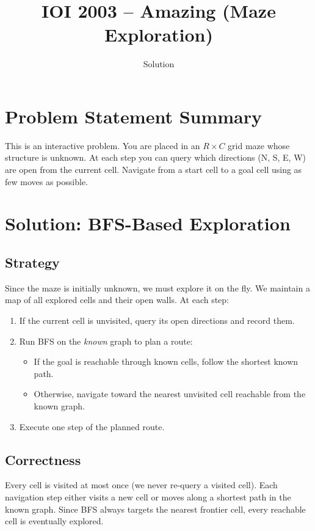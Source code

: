 \documentclass[11pt,a4paper]{article}
\title{IOI 2003 -- Amazing (Maze Exploration)}
\author{Solution}
\date{}
\begin{document}
\maketitle

\section{Problem Statement Summary}
This is an interactive problem. You are placed in an $R \times C$ grid
maze whose structure is unknown. At each step you can query which
directions (N, S, E, W) are open from the current cell. Navigate from a
start cell to a goal cell using as few moves as possible.

\section{Solution: BFS-Based Exploration}

\subsection{Strategy}
Since the maze is initially unknown, we must explore it on the fly.
We maintain a map of all explored cells and their open walls. At each
step:
\begin{enumerate}
  \item If the current cell is unvisited, query its open directions and
        record them.
  \item Run BFS on the \emph{known} graph to plan a route:
        \begin{itemize}
          \item If the goal is reachable through known cells, follow the
                shortest known path.
          \item Otherwise, navigate toward the nearest unvisited cell
                reachable from the known graph.
        \end{itemize}
  \item Execute one step of the planned route.
\end{enumerate}

\subsection{Correctness}
Every cell is visited at most once (we never re-query a visited cell).
Each navigation step either visits a new cell or moves along a shortest
path in the known graph. Since BFS always targets the nearest frontier
cell, every reachable cell is eventually explored.
\end{document}
